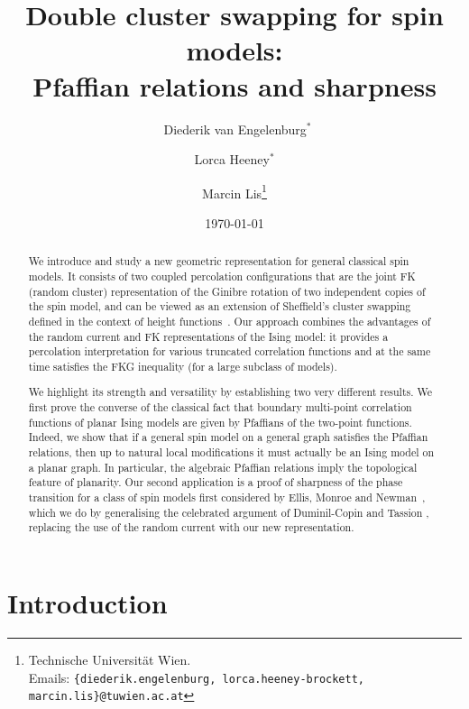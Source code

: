 \documentclass{article}
\title{{Double cluster swapping for spin models: \\Pfaffian relations and sharpness}}
\date{\today}
\author{\ Diederik van Engelenburg$^*$ \and Lorca Heeney$^*$ \and  Marcin Lis\thanks{ Technische Universität Wien.\\ Emails: \texttt{\{diederik.engelenburg, lorca.heeney-brockett, marcin.lis\}@tuwien.ac.at}
}}
\numberwithin{equation}{section}
\theoremstyle{definition}
\theoremstyle{definition}
\theoremstyle{remark}
\begin{document}
%	
\maketitle
\begin{abstract}
We introduce and study a new geometric representation for general classical spin models. 
It consists of two coupled percolation configurations that are the joint FK (random cluster) representation of the Ginibre rotation of two independent copies of the spin model, and can be viewed as an extension of Sheffield's cluster swapping defined in the context of height functions~\cite{She}.
Our approach combines the advantages of the random current and FK representations of the Ising model: it provides a percolation interpretation for various truncated correlation functions and at the same
time satisfies the FKG inequality (for a large subclass of models).

We highlight its strength and versatility by establishing two very different results. We first prove the converse of the classical fact that boundary multi-point correlation functions of planar Ising models
are given by Pfaffians of the two-point functions. Indeed, we show that if a general spin model on a general graph satisfies the Pfaffian relations, then up to natural local modifications it must actually be an Ising model on a planar graph. In particular, the algebraic Pfaffian relations imply the topological feature of planarity. 
Our second application is a proof of sharpness of the phase transition for a class of spin models first considered by Ellis, Monroe and Newman~\cite{ellis1976ghs}, which we do by generalising the celebrated argument of Duminil-Copin and Tassion \cite{DCT}, replacing the use of the random current with our new representation.
\end{abstract}
\tableofcontents




%




\section{Introduction}
\end{document}
